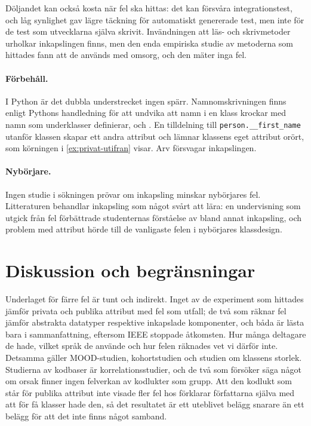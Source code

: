 Döljandet kan också kosta när fel ska hittas: det kan försvåra
integrationstest\autocite{Voas1997Assertions}, och låg synlighet gav
lägre täckning för automatiskt genererade test, men inte för de test som
utvecklarna själva skrivit\autocite[951]{Ma2017Visibility}.
Invändningen att läs- och skrivmetoder urholkar inkapslingen finns, men
den enda empiriska studie av metoderna som hittades fann att de används
med omsorg\autocite{Lumpe2010Properties}, och den mäter inga fel.

\paragraph{Förbehåll.}  I Python är det dubbla understrecket ingen
spärr.  Namnomskrivningen finns enligt Pythons handledning för att
undvika att namn i en klass krockar med namn som underklasser definierar,
och .  En tilldelning till
\texttt{person.__first_name} utanför klassen skapar ett
andra attribut och lämnar klassens eget attribut orört, som körningen i
\cref{ex:privat-utifran} visar.  Arv försvagar
inkapslingen\autocite{Snyder1986}.

\paragraph{Nybörjare.}  Ingen studie i sökningen prövar om inkapsling
minskar nybörjares fel.  Litteraturen behandlar inkapsling som något
svårt att lära: en undervisning som utgick från fel förbättrade
studenternas förståelse av bland annat inkapsling\autocite{ShmalloGinat2025},
och problem med attribut hörde till de vanligaste felen i nybörjares
klassdesign\autocite{Thomasson2006Novice}.

\section{Diskussion och begränsningar}
\label{sec:inkf-diskussion}

Underlaget för färre fel är tunt och indirekt.  Inget av de experiment
som hittades jämför privata och publika attribut med fel som utfall; de
två som räknar fel jämför abstrakta datatyper respektive inkapslade
komponenter\autocite{Meeson1979DataAbstraction,Zweben1995Layering}, och
båda är lästa bara i sammanfattning, eftersom IEEE stoppade åtkomsten.
Hur många deltagare de hade, vilket språk de använde och hur felen
räknades vet vi därför inte.  Detsamma gäller MOOD-studien,
kohortstudien och studien om klassens storlek.  Studierna av kodbaser är
korrelationsstudier, och de två som försöker säga något om orsak finner
ingen felverkan av kodlukter som grupp.  Att den kodlukt som står för
publika attribut inte visade fler fel hos \textcite{Khomh2012Antipatterns}
förklarar författarna själva med att för få klasser hade den, så det
resultatet är ett uteblivet belägg snarare än ett belägg för att det
inte finns något samband.

